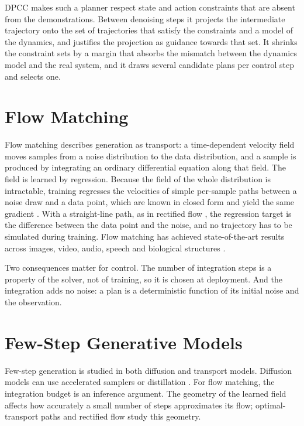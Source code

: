\ac{DPCC} \parencite{romer2025diffusion} makes such a planner respect state and action constraints
that are absent from the demonstrations. Between denoising steps it projects the intermediate
trajectory onto the set of trajectories that satisfy the constraints and a model of the dynamics, and
justifies the projection as guidance towards that set. It shrinks the constraint sets by a margin that
absorbs the mismatch between the dynamics model and the real system, and it draws several candidate
plans per control step and selects one.

\section{Flow Matching}\label{sec:bg:fm}

Flow matching \parencite{lipman2023flow,lipman2024guide} describes generation as transport: a
time-dependent velocity field moves samples from a noise distribution to the data distribution, and a
sample is produced by integrating an ordinary differential equation along that field. The field is
learned by regression. Because the field of the whole distribution is intractable, training regresses
the velocities of simple per-sample paths between a noise draw and a data point, which are known in
closed form and yield the same gradient \parencite{lipman2023flow}. With a straight-line path, as in
rectified flow \parencite{liu2023flow}, the regression target is the difference between the data point
and the noise, and no trajectory has to be simulated during training. Flow matching has achieved
state-of-the-art results across images, video, audio, speech and biological structures
\parencite{lipman2024guide}.

Two consequences matter for control. The number of integration steps is a property of the solver, not
of training, so it is chosen at deployment. And the integration adds no noise: a plan is a
deterministic function of its initial noise and the observation.

\section{Few-Step Generative Models}\label{sec:bg:fewstep}

Few-step generation is studied in both diffusion and transport models. Diffusion models can use
accelerated samplers \parencite{song2021denoising} or distillation \parencite{wang2024onedp}.
For flow matching, the integration budget is an inference argument. The geometry of the learned
field affects how accurately a small number of steps approximates its flow; optimal-transport paths
\parencite{lipman2023flow} and rectified flow \parencite{liu2023flow} study this geometry.

